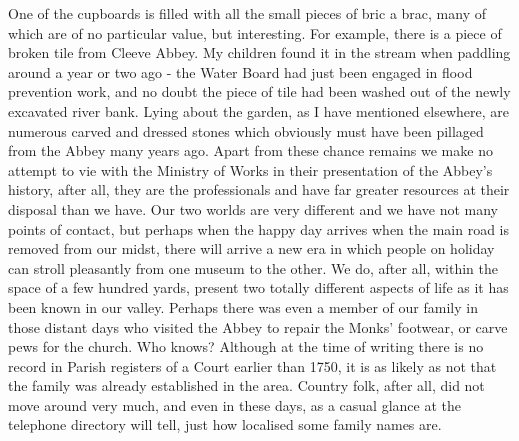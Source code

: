 One of the cupboards is filled with all the small pieces of bric a brac, many of which are of no particular value, but interesting. For example, there is a piece of broken tile from Cleeve Abbey. My children found it in the stream when paddling around a year or two ago - the Water Board had just been engaged in flood prevention work, and no doubt the piece of tile had been washed out of the newly excavated river bank. Lying about the garden, as I have mentioned elsewhere, are numerous carved and dressed stones which obviously must have been pillaged from the Abbey many years ago. Apart from these chance remains we make no attempt to vie with the Ministry of Works in their presentation of the Abbey's history, after all, they are the professionals and have far greater resources at their disposal than we have. Our two worlds are very different and we have not many points of contact, but perhaps when the happy day arrives when the main road is removed from our midst, there will arrive a new era in which people on holiday can stroll pleasantly from one museum to the other. We do, after all, within the space of a few hundred yards, present two totally different aspects of life as it has been known in our valley. Perhaps there was even a member of our family in those distant days who visited the Abbey to repair the Monks' footwear, or carve pews for the church. Who knows? Although at the time of writing there is no record in Parish registers of a Court earlier than 1750, it is as likely as not that the family was already established in the area. Country folk, after all, did not move around very much, and even in these days, as a casual glance at the telephone directory will tell, just how localised some family names are.
